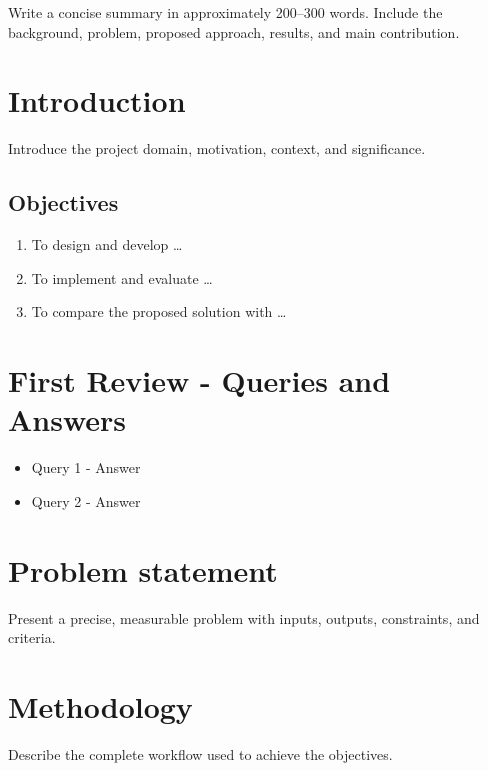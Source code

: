 \documentclass{ssnreview}
\begin{document}
\makereviewtitle
\reviewfrontmatter

\begin{reviewabstract}
Write a concise summary in approximately 200--300 words. Include the background,
problem, proposed approach, results, and main contribution.

\end{reviewabstract}

\chapter{Introduction}
Introduce the project domain, motivation, context, and significance.
\section{Objectives}
\begin{enumerate}[label=\arabic*.]
  \item To design and develop \ldots
  \item To implement and evaluate \ldots
  \item To compare the proposed solution with \ldots
\end{enumerate}


\chapter{First Review - Queries and Answers}
\begin{itemize}
  \item Query 1 - Answer
  \item Query 2 - Answer
\end{itemize}


\chapter{Problem statement}
Present a precise, measurable problem with inputs, outputs, constraints, and criteria.

\chapter{Methodology}
Describe the complete workflow used to achieve the objectives.
\end{document}
